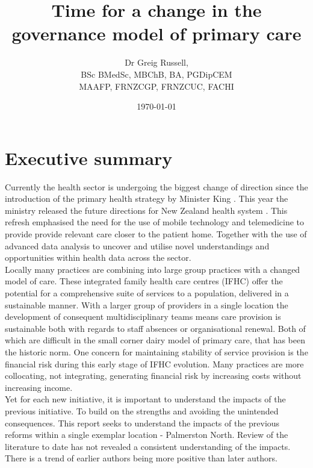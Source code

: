 \documentclass[11pt,a4paper]{article}
\title{\textbf{Time for a change in the governance model of primary care}}
\author{Dr Greig Russell, \\ BSc BMedSc, MBChB, BA, PGDipCEM \\ MAAFP, FRNZCGP, FRNZCUC, FACHI}
\date{\today}
\begin{document}
\maketitle

\pagebreak

\tableofcontents

\pagebreak
\pagebreak

\listoffigures

\pagebreak
\section{Executive summary}
Currently the health sector is undergoing the biggest change of direction since the introduction of the primary health strategy by Minister King \citep{king2001primary}. This year the ministry released the future directions for New Zealand health system \citep{ministry2016new}. This refresh emphasised the need for the use of mobile technology and telemedicine to provide provide relevant care closer to the patient home. Together with the use of advanced data analysis to uncover and utilise novel understandings and opportunities within health data across the sector.\\

Locally many practices are combining into large group practices with a changed model of care. These integrated family health care centres (IFHC) offer the potential for a comprehensive suite of services to a population, delivered in a sustainable manner. With a larger group of providers in a single location the development of consequent multidisciplinary teams means care provision is sustainable both with regards to staff absences or organisational renewal. Both of which are difficult in the small corner dairy model of primary care, that has been the historic norm. One concern for maintaining stability of service provision is the financial risk during this early stage of IFHC evolution. Many practices are more collocating, not integrating, generating financial risk by increasing costs without increasing income. \\

Yet for each new initiative, it is important to understand the impacts of the previous initiative. To build on the strengths and avoiding the unintended consequences. This report seeks to understand the impacts of the previous reforms within a single exemplar location - Palmerston North. Review of the literature to date has not revealed a consistent understanding of the impacts. There is a trend of earlier authors being more positive than later authors. \\
\end{document}
